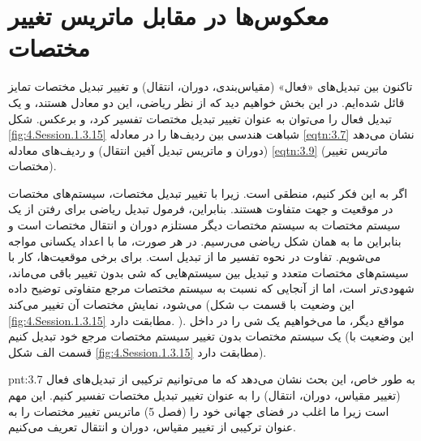 \section{\textbf{معکوس‌ها در مقابل ماتریس تغییر مختصات}}
\label{sec:3.5}
{
    \Large
    \begin{spacing}{1.5}
        تاکنون بین تبدیل‌های «فعال» (مقیاس‌بندی، دوران، انتقال) و تغییر تبدیل مختصات تمایز قائل شده‌ایم.
        در این بخش خواهیم دید که از نظر ریاضی، این دو معادل هستند، و یک تبدیل فعال را می‌توان به عنوان تغییر تبدیل مختصات تفسیر کرد، و برعکس.
        شکل \ref{fig:4.Session.1.3.15} شباهت هندسی بین ردیف‌ها را در معادله \ref{eqtn:3.7} نشان می‌دهد (دوران و ماتریس تبدیل آفین انتقال) و ردیف‌های معادله \ref{eqtn:3.9} (ماتریس تغییر مختصات).

        اگر به این فکر کنیم، منطقی است. زیرا با تغییر تبدیل مختصات، سیستم‌های مختصات در موقعیت و جهت متفاوت هستند.
        بنابراین، فرمول تبدیل ریاضی برای رفتن از یک سیستم مختصات به سیستم مختصات دیگر مستلزم دوران و انتقال مختصات است
        و بنابراین ما به همان شکل ریاضی می‌رسیم. در هر صورت، ما با اعداد یکسانی مواجه می‌شویم.
        تفاوت در نحوه تفسیر ما از تبدیل است. برای برخی موقعیت‌ها، کار با سیستم‌های مختصات متعدد و تبدیل بین سیستم‌هایی که شی بدون تغییر باقی می‌ماند، شهودی‌تر است،
        اما از آنجایی که نسبت به سیستم مختصات مرجع متفاوتی توضیح داده می‌شود، نمایش مختصات آن تغییر می‌کند (این وضعیت با قسمت ب شکل \ref{fig:4.Session.1.3.15} مطابقت دارد. ).
        مواقع دیگر، ما می‌خواهیم یک شی را در داخل یک سیستم مختصات بدون تغییر سیستم مختصات مرجع خود تبدیل کنیم (این وضعیت با قسمت الف شکل \ref{fig:4.Session.1.3.15} مطابقت دارد).

        \begin{point}{pnt:3.7}
            \Large
            به طور خاص، این بحث نشان می‌دهد که ما می‌توانیم ترکیبی از تبدیل‌های فعال (تغییر مقیاس، دوران، انتقال) را به عنوان تغییر تبدیل مختصات تفسیر کنیم.
            این مهم است زیرا ما اغلب در فضای جهانی خود را (فصل 5) ماتریس تغییر مختصات را به عنوان ترکیبی از تغییر مقیاس، دوران و انتقال تعریف می‌کنیم.
        \end{point}


\end{spacing}}
